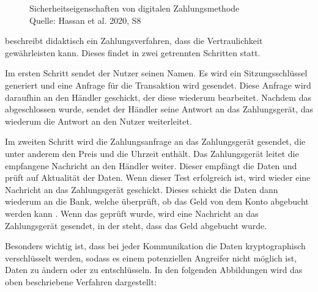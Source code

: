 \vfill
\begin{figure}[htb]
    \caption{Sicherheitseigenschaften von digitalen Zahlungsmethode \\ Quelle: Hassan et al. 2020, S8}
    \label{fig:refark_HARE}
\end{figure}
\vfill

\cite{refart:JTAS} beschreibt didaktisch ein Zahlungsverfahren, dass die Vertraulichkeit gewährleisten kann.
Dieses findet in zwei getrennten Schritten statt.

Im ersten Schritt sendet der Nutzer seinen Namen. Es wird ein Sitzungsschlüssel generiert und 
eine Anfrage für die Transaktion wird gesendet. Diese Anfrage wird daraufhin an den Händler geschickt, der 
diese wiederum bearbeitet. Nachdem das abgeschlossen wurde, sendet der Händler seine Antwort an das Zahlungsgerät, 
das wiederum die Antwort an den Nutzer weiterleitet. 

Im zweiten Schritt wird die Zahlungsanfrage an das Zahlungsgerät gesendet, die unter anderem den Preis und die 
Uhrzeit enthält. Das Zahlungsgerät leitet die empfangene Nachricht an den Händler weiter. Dieser empfängt die Daten 
und prüft auf Aktualität der Daten. Wenn dieser Test erfolgreich ist, wird wieder eine Nachricht an das Zahlungsgerät 
geschickt. Dieses schickt die Daten dann wiederum an die Bank, welche überprüft, ob das Geld von dem Konto 
abgebucht werden kann \cite{refip:ZYAM}. Wenn das geprüft wurde, wird eine Nachricht an das Zahlungsgerät gesendet, in der steht, 
dass das Geld abgebucht wurde. 

Besonders wichtig ist, dass bei jeder Kommunikation die Daten kryptographisch verschlüsselt werden, sodass es einem 
potenziellen Angreifer nicht möglich ist, Daten zu ändern oder zu entschlüsseln. In den folgenden Abbildungen wird
das oben beschriebene Verfahren dargestellt:

